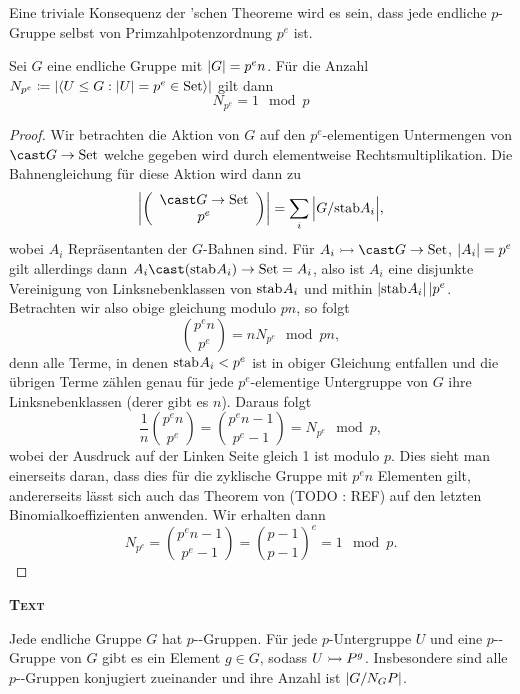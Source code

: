 \begin{remark}
    Eine triviale Konsequenz der 'schen Theoreme wird es sein, dass jede endliche $p$-Gruppe selbst von
    Primzahlpotenzordnung $p^e$ ist.
\end{remark}
%
\begin{theorem}
    Sei $G$ eine endliche Gruppe mit $\left\vert{G}\right\vert = p^e n$. Für die Anzahl $N_{p^e}\mathrel{\mathrel{\mathop:}\mkern-1.2mu=} \left\vert{\left\langle U\leq G:\left\vert{U}\right\vert=p^e\in\mathbf{\mathrm{Set}}\right\rangle}\right\vert$ gilt dann
    $$
    N_{p^e} = 1 \mod p
    $$
\end{theorem}
%
\begin{proof}
    Wir betrachten die Aktion von $G$ auf den $p^e$-elementigen Untermengen von $\cast G \to \set$ welche gegeben wird durch
    elementweise Rechtsmultiplikation. Die Bahnengleichung für diese Aktion wird dann zu
    $$
    \size {\binom {\cast G \to \set} {p^e}} = \sum_i {\size {G/\stab A_i}},
    $$
    wobei $A_i$ Repräsentanten der $G$-Bahnen sind.
    Für $A_i\monoto \cast G \to \set$, $\left\vert{A_i}\right\vert=p^e$ gilt allerdings dann $A_i \cast (\stab A_i) \to \set=A_i$, also ist $A_i$ eine disjunkte
    Vereinigung von Linksnebenklassen von $\stab A_i$ und mithin $\size {\stab A_i}\divides p^e$. Betrachten wir also obige
    gleichung modulo $pn$, so folgt
    $$
    \binom {p^e n}{p^e} = n N_{p^e} \mod pn, 
    $$
    denn alle Terme, in denen $\stab A_i<p^e$ ist in obiger Gleichung entfallen und die übrigen Terme zählen genau für jede
    $p^e$-elementige Untergruppe von $G$ ihre Linksnebenklassen (derer gibt es $n$).
    Daraus folgt
    $$
    \frac 1 n \binom {p^e n}{p^e} = \binom {p^e n-1} {p^e-1} = N_{p^e} \mod p,
    $$
    wobei der Ausdruck auf der Linken Seite gleich 1 ist modulo $p$. Dies sieht man einerseits daran, dass dies für die zyklische
    Gruppe mit $p^e n$ Elementen gilt, andererseits lässt sich auch das Theorem von  (TODO : REF) auf den letzten
    Binomialkoeffizienten anwenden. Wir erhalten dann
    $$
    N_{p^e} = \binom {p^e n - 1} {p^e -1} = {\binom {p-1} {p-1}}^e = 1 \mod p.
    $$
\end{proof}

{\bfseries\scshape Text}

\begin{theorem}
    Jede endliche Gruppe $G$ hat $p$--Gruppen. Für jede $p$-Untergruppe $U$ und eine $p$--Gruppe von
    $G$ gibt es ein Element $g\in G$, sodass $U\rightarrowtail P^g$. Insbesondere sind alle $p$--Gruppen konjugiert zueinander
    und ihre Anzahl ist $\left\vert{G/N_G P}\right\vert$. 
\end{theorem}

